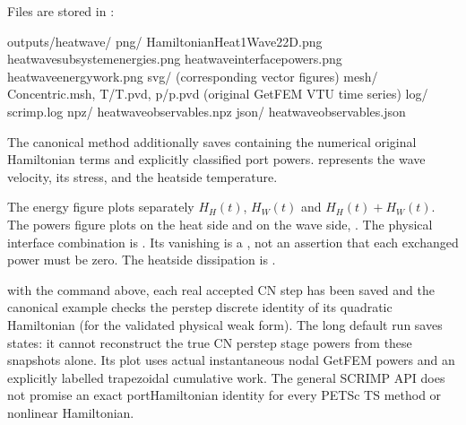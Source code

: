 \documentclass[letterpaper,10pt,english]{sphinxmanual}
\begin{document}
\sphinxAtStartPar
Files are stored in :

\begin{sphinxVerbatim}[commandchars=\\\{\}]
outputs/heat\PYGZus{}wave/
  png/       Hamiltonian\PYGZus{}Heat1\PYGZus{}Wave2\PYGZus{}2D.png
             heat\PYGZus{}wave\PYGZus{}subsystem\PYGZus{}energies.png
             heat\PYGZus{}wave\PYGZus{}interface\PYGZus{}powers.png
             heat\PYGZus{}wave\PYGZus{}energy\PYGZus{}work.png
  svg/       (corresponding vector figures)
  mesh/      Concentric.msh, T/T.pvd, p/p.pvd
             (original GetFEM VTU time series)
  log/       scrimp.log
  npz/       heat\PYGZus{}wave\PYGZus{}observables.npz
  json/      heat\PYGZus{}wave\PYGZus{}observables.json
\end{sphinxVerbatim}

\sphinxAtStartPar
The canonical  method additionally
saves  containing
the numerical original Hamiltonian terms and
explicitly classified port powers.  represents
the wave velocity,  its stress, and 
the heat\sphinxhyphen{}side temperature.

\sphinxAtStartPar
The energy figure plots separately
\(H_H(t)\), \(H_W(t)\) and
\(H_H(t)+H_W(t)\). The powers figure
plots  on the heat side and
 on the wave side, .
The physical interface combination is
. Its vanishing is
a , not an assertion
that each exchanged power must be zero.
The heat\sphinxhyphen{}side dissipation is
.

\sphinxAtStartPar
{} with the
command above, each real accepted CN step has been
saved and the canonical example checks the
per\sphinxhyphen{}step discrete identity of its quadratic
Hamiltonian (for the validated physical weak form).
The long default run 
saves  states: it cannot reconstruct
the true CN per\sphinxhyphen{}step stage powers from these
snapshots alone. Its plot uses actual instantaneous
nodal GetFEM powers and an explicitly labelled
 trapezoidal cumulative work.
The general SCRIMP API does not promise
an exact port\sphinxhyphen{}Hamiltonian identity for every
PETSc TS method or nonlinear Hamiltonian.
\end{document}
